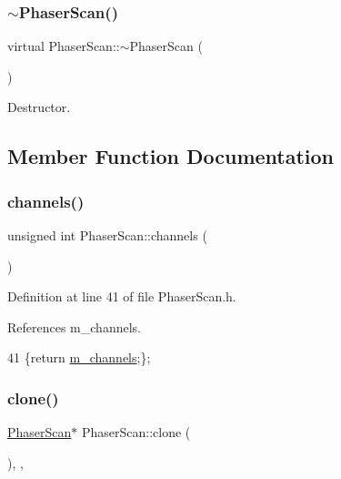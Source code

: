 \subsubsection{\texorpdfstring{$\sim$\+Phaser\+Scan()}{~PhaserScan()}}
{\footnotesize\ttfamily virtual Phaser\+Scan\+::$\sim$\+Phaser\+Scan (\begin{DoxyParamCaption}{ }\end{DoxyParamCaption})\hspace{0.3cm}{\ttfamily [virtual]}}



Destructor. 



\subsection{Member Function Documentation}
\mbox{\label{classPhaserScan_ae3752906e17afd1f7ee5f62a08711871}} 
\subsubsection{\texorpdfstring{channels()}{channels()}}
{\footnotesize\ttfamily unsigned int Phaser\+Scan\+::channels (\begin{DoxyParamCaption}{ }\end{DoxyParamCaption})\hspace{0.3cm}{\ttfamily [inline]}}



Definition at line 41 of file Phaser\+Scan.\+h.



References m\+\_\+channels.


\begin{DoxyCode}
41 \{\textcolor{keywordflow}{return} \hyperlink{classPhaserScan_a3e9894ae646ed25d26a07532c1a2b8b7}{m\_channels};\};
\end{DoxyCode}
\mbox{\label{classPhaserScan_a4c842f4bda17fb8907c51efc0ccb9d43}} 
\subsubsection{\texorpdfstring{clone()}{clone()}}
{\footnotesize\ttfamily \hyperlink{classPhaserScan}{Phaser\+Scan}$\ast$ Phaser\+Scan\+::clone (\begin{DoxyParamCaption}{ }\end{DoxyParamCaption})\hspace{0.3cm}{\ttfamily [inline]}, {\ttfamily [protected]}, {\ttfamily [virtual]}}

